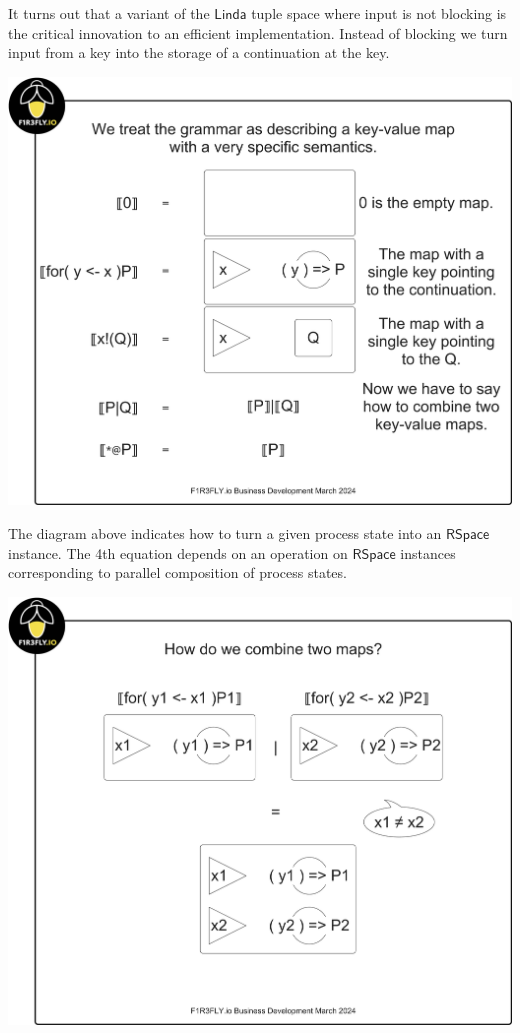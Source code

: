 It turns out that a variant of the $\mathsf{Linda}$ tuple space where
input is not blocking is the critical innovation to an efficient
implementation. Instead of blocking we turn input from a key into the
storage of a continuation at the key.

\includegraphics[scale=0.25]{RHO20RSpaceSlide1.pdf}

The diagram above indicates how to turn a given process state into an
$\mathsf{RSpace}$ instance. The 4th equation depends on an operation
on $\mathsf{RSpace}$ instances corresponding to parallel composition
of process states.

\includegraphics[scale=0.25]{RHO20RSpaceSlide2.pdf}

